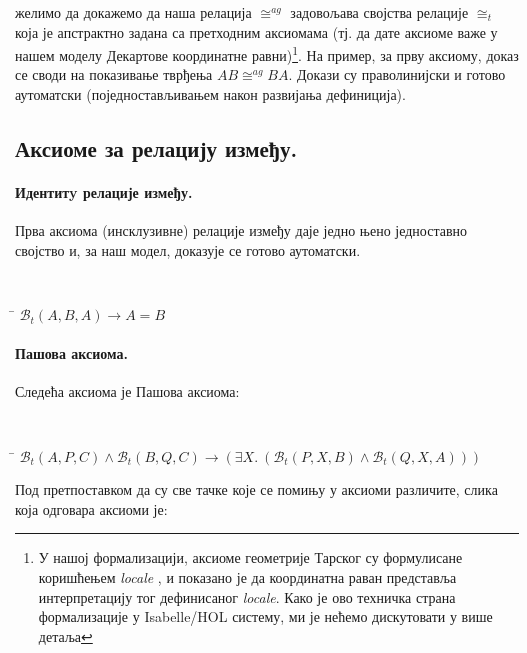 \documentclass[a4paper, 12pt]{article}
\newcommand{\agcongr}[4]{\ensuremath{#1#2 \cong^{ag} #3#4}}
\newcommand{\bett}[3]{\ensuremath{\mathcal{B}_t(#1, #2, #3)}}
\newcommand{\congrt}[4]{\ensuremath{#1#2 \cong_t #3#4}}
\begin{document}
желимо да докажемо да наша релација $\agcongr{}{}{}{}$ задовољава
својства релације $\congrt{}{}{}{}$ која је апстрактно задана са
претходним аксиомама (тј. да дате аксиоме важе у нашем моделу
Декартове координатне равни)\footnote{У нашој формализацији, аксиоме
  геометрије Тарског су формулисане коришћењем \emph{locale}
  \cite{locales}, и показано је да координатна раван представља
  интерпретацију тог дефинисаног \emph{locale}. Како је ово техничка
  страна формализације у Isabelle/HOL систему, ми је нећемо
  дискутовати у више детаља}.  На пример, за прву аксиому, доказ се
своди на показивање тврђења \mbox{$\agcongr{A}{B}{B}{A}$}. Докази су
праволинијски и готово аутоматски (поједностављивањем након развијања
дефиниција).

\subsection{Аксиоме за релацију између.}


\paragraph{Идентитy релације између.}

Прва аксиома (инсклузивне) релације између даје једно њено једноставно
својство и, за наш модел, доказује се готово аутоматски.

{\tt
\begin{tabbing}
\hspace{5mm}\=\kill
$\bett{A}{B}{A} \longrightarrow A = B$
\end{tabbing}
}

\paragraph{Пашова аксиома.}

Следећа аксиома је Пашова аксиома:
{\tt
\begin{tabbing}
\hspace{5mm}\=\kill
$\bett{A}{P}{C} \wedge \bett{B}{Q}{C} \longrightarrow (\exists X.\ (\bett{P}{X}{B} \wedge \bett{Q}{X}{A}))$
\end{tabbing}
}

Под претпоставком да су све тачке које се помињу у аксиоми различите,
слика која одговара аксиоми је:
\begin{center}

\end{center}
\end{document}
